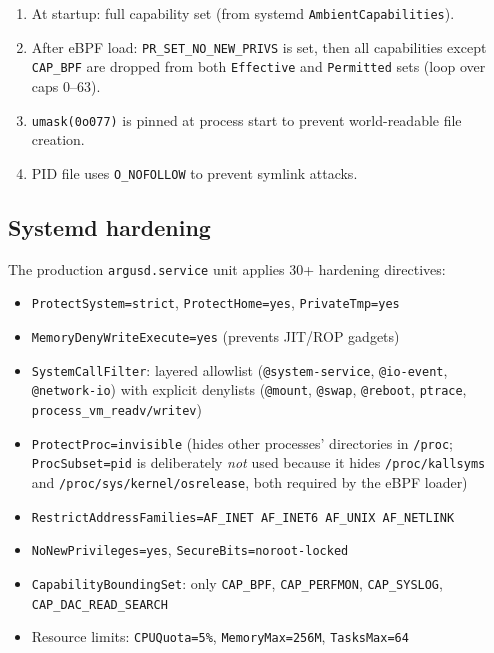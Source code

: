 \documentclass[11pt]{article}
\begin{document}
\begin{enumerate}[nosep]
  \item At startup: full capability set (from systemd
        \texttt{AmbientCapabilities}).
  \item After eBPF load: \texttt{PR\_SET\_NO\_NEW\_PRIVS} is set, then all
        capabilities except \texttt{CAP\_BPF} are dropped from both
        \texttt{Effective} and \texttt{Permitted} sets (loop over caps 0--63).
  \item \texttt{umask(0o077)} is pinned at process start to prevent
        world-readable file creation.
  \item PID file uses \texttt{O\_NOFOLLOW} to prevent symlink attacks.
\end{enumerate}

\subsection{Systemd hardening}

The production \texttt{argusd.service} unit applies 30+ hardening directives:

\begin{itemize}[nosep]
  \item \texttt{ProtectSystem=strict}, \texttt{ProtectHome=yes},
        \texttt{PrivateTmp=yes}
  \item \texttt{MemoryDenyWriteExecute=yes} (prevents JIT/ROP gadgets)
  \item \texttt{SystemCallFilter}: layered allowlist (\texttt{@system-service},
        \texttt{@io-event}, \texttt{@network-io}) with explicit denylists
        (\texttt{@mount}, \texttt{@swap}, \texttt{@reboot}, \texttt{ptrace},
        \texttt{process\_vm\_readv/writev})
  \item \texttt{ProtectProc=invisible} (hides other processes' directories in
        \texttt{/proc}; \texttt{ProcSubset=pid} is deliberately \emph{not} used
        because it hides \texttt{/proc/kallsyms} and
        \texttt{/proc/sys/kernel/osrelease}, both required by the eBPF loader)
  \item \texttt{RestrictAddressFamilies=AF\_INET AF\_INET6 AF\_UNIX AF\_NETLINK}
  \item \texttt{NoNewPrivileges=yes}, \texttt{SecureBits=noroot-locked}
  \item \texttt{CapabilityBoundingSet}: only \texttt{CAP\_BPF},
        \texttt{CAP\_PERFMON}, \texttt{CAP\_SYSLOG},
        \texttt{CAP\_DAC\_READ\_SEARCH}
  \item Resource limits: \texttt{CPUQuota=5\%}, \texttt{MemoryMax=256M},
        \texttt{TasksMax=64}
\end{itemize}
\end{document}
